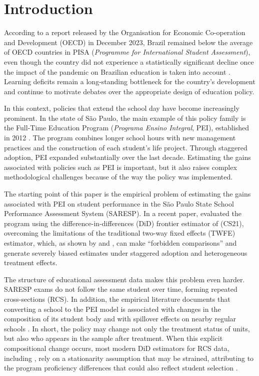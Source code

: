 \section{Introduction} \label{sec:introduction}

According to a report released by the Organisation for Economic Co-operation and Development (OECD) in December 2023, Brazil remained below the average of OECD countries in PISA (\textit{Programme for International Student Assessment}), even though the country did not experience a statistically significant decline once the impact of the pandemic on Brazilian education is taken into account \parencite{oecd_pisa2022_brazil}. Learning deficits remain a long-standing bottleneck for the country's development and continue to motivate debates over the appropriate design of education policy.

In this context, policies that extend the school day have become increasingly prominent. In the state of São Paulo, the main example of this policy family is the Full-Time Education Program (\textit{Programa Ensino Integral}, PEI), established in 2012 \parencite{sao_paulo_pei_2012}. The program combines longer school hours with new management practices and the construction of each student's life project. Through staggered adoption, PEI expanded substantially over the last decade. Estimating the gains associated with policies such as PEI is important, but it also raises complex methodological challenges because of the way the policy was implemented.

The starting point of this paper is the empirical problem of estimating the gains associated with PEI on student performance in the São Paulo State School Performance Assessment System (SARESP). In a recent paper, \textcite{scorzafave2023} evaluated the program using the difference-in-differences (DiD) frontier estimator of \textcite{callawaysantanna} (CS21), overcoming the limitations of the traditional two-way fixed effects (TWFE) estimator, which, as shown by \textcite{goodmanbacon} and \textcite{chaisemartin2020}, can make ``forbidden comparisons'' and generate severely biased estimates under staggered adoption and heterogeneous treatment effects.

The structure of educational assessment data makes this problem even harder. SARESP exams do not follow the same student over time, forming repeated cross-sections (RCS). In addition, the empirical literature documents that converting a school to the PEI model is associated with changes in the composition of its student body \parencite{favaro_composicao_pei} and with spillover effects on nearby regular schools \parencite{santos2022_spillover_pei_escolas_regulares}. In short, the policy may change not only the treatment status of units, but also who appears in the sample after treatment. When this explicit compositional change occurs, most modern DiD estimators for RCS data, including \textcite{callawaysantanna}, rely on a stationarity assumption that may be strained, attributing to the program proficiency differences that could also reflect student selection \parencite{santannaxu}.

